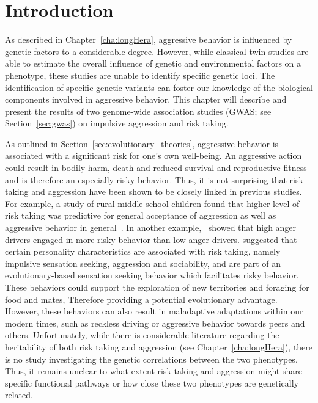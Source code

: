 \section{Introduction}
\label{sec:introduction_assoc}

As described in Chapter~\ref{cha:longHera}, aggressive behavior is influenced by genetic factors to a considerable degree.
However, while classical twin studies are able to estimate the overall influence of genetic and environmental factors on a phenotype, these studies are unable to identify specific genetic loci.
The identification of specific genetic variants can foster our knowledge of the biological components involved in aggressive behavior. 
This chapter will describe and present the results of two genome-wide association studies (GWAS; see Section~\ref{sec:gwas}) on impulsive aggression and risk taking.

As outlined in Section~\ref{sec:evolutionary_theories}, aggressive behavior is associated with a significant risk for one's own well-being.
An aggressive action could result in bodily harm, death and reduced survival and reproductive fitness and is therefore an especially risky behavior.
Thus, it is not surprising that risk taking and aggression have been shown to be closely linked in previous studies.
For example, a study of rural middle school children found that higher level of risk taking was  predictive for general acceptance of aggression as well as aggressive behavior in general~\cite{Swaim2004}.
In another example,~\citet{Deffenbacher2003} showed that high anger drivers engaged in more risky behavior than low anger drivers.
\citet{Zuckerman2000} suggested that certain personality characteristics are associated with risk taking, namely impulsive sensation seeking, aggression and sociability, and are part of an evolutionary-based sensation seeking behavior which facilitates risky behavior.
These behaviors could support the exploration of new territories and foraging for food and mates,
Therefore providing a potential evolutionary advantage.
However, these behaviors can also result in maladaptive adaptations within our modern times, such as reckless driving or aggressive behavior towards peers and others.
Unfortunately, while there is considerable literature regarding the heritability of both risk taking and aggression (see Chapter~\ref{cha:longHera}), there is no study investigating the genetic correlations between the two phenotypes.
Thus, it remains unclear to what extent risk taking and aggression might share specific functional pathways or how close these two phenotypes are genetically related.

